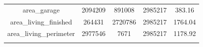 \documentclass[]{book}
\theoremstyle{definition}
\theoremstyle{definition}
\theoremstyle{definition}
\theoremstyle{remark}
\begin{document}
\begin{longtable}[]{@{}ccccc@{}}
\begin{minipage}[t]{0.35\columnwidth}\centering\strut
area\_garage\strut
\end{minipage} & \begin{minipage}[t]{0.12\columnwidth}\centering\strut
2094209\strut
\end{minipage} & \begin{minipage}[t]{0.13\columnwidth}\centering\strut
891008\strut
\end{minipage} & \begin{minipage}[t]{0.12\columnwidth}\centering\strut
2985217\strut
\end{minipage} & \begin{minipage}[t]{0.12\columnwidth}\centering\strut
383.16\strut
\end{minipage}\tabularnewline
\begin{minipage}[t]{0.35\columnwidth}\centering\strut
area\_living\_finished\strut
\end{minipage} & \begin{minipage}[t]{0.12\columnwidth}\centering\strut
264431\strut
\end{minipage} & \begin{minipage}[t]{0.13\columnwidth}\centering\strut
2720786\strut
\end{minipage} & \begin{minipage}[t]{0.12\columnwidth}\centering\strut
2985217\strut
\end{minipage} & \begin{minipage}[t]{0.12\columnwidth}\centering\strut
1764.04\strut
\end{minipage}\tabularnewline
\begin{minipage}[t]{0.35\columnwidth}\centering\strut
area\_living\_perimeter\strut
\end{minipage} & \begin{minipage}[t]{0.12\columnwidth}\centering\strut
2977546\strut
\end{minipage} & \begin{minipage}[t]{0.13\columnwidth}\centering\strut
7671\strut
\end{minipage} & \begin{minipage}[t]{0.12\columnwidth}\centering\strut
2985217\strut
\end{minipage} & \begin{minipage}[t]{0.12\columnwidth}\centering\strut
1178.92\strut
\end{minipage}\tabularnewline
\begin{minipage}[t]{0.35\columnwidth}\centering\strut

\end{minipage}
\end{longtable}
\end{document}

